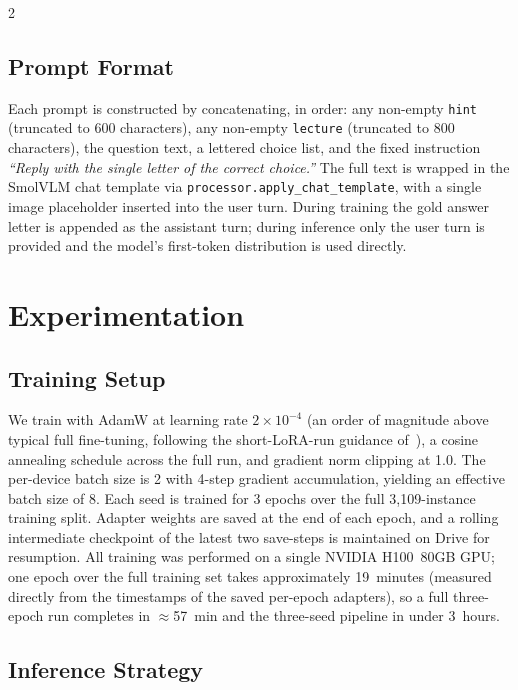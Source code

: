 \documentclass[11pt,a4paper]{article}
\begin{document}
\begin{multicols}{2}
\subsection{Prompt Format}

Each prompt is constructed by concatenating, in order: any non-empty \texttt{hint} (truncated to 600 characters), any non-empty \texttt{lecture} (truncated to 800 characters), the question text, a lettered choice list, and the fixed instruction \emph{``Reply with the single letter of the correct choice.''} The full text is wrapped in the SmolVLM chat template via \texttt{processor.apply\_chat\_template}, with a single image placeholder inserted into the user turn. During training the gold answer letter is appended as the assistant turn; during inference only the user turn is provided and the model's first-token distribution is used directly.

\section{Experimentation}

\subsection{Training Setup}

We train with AdamW at learning rate $2\times10^{-4}$ (an order of magnitude above typical full fine-tuning, following the short-LoRA-run guidance of~\cite{schulman2025loraregret}), a cosine annealing schedule across the full run, and gradient norm clipping at 1.0. The per-device batch size is 2 with 4-step gradient accumulation, yielding an effective batch size of 8. Each seed is trained for 3 epochs over the full 3{,}109-instance training split. Adapter weights are saved at the end of each epoch, and a rolling intermediate checkpoint of the latest two save-steps is maintained on Drive for resumption. All training was performed on a single NVIDIA H100~80GB GPU; one epoch over the full training set takes approximately 19~minutes (measured directly from the timestamps of the saved per-epoch adapters), so a full three-epoch run completes in $\approx$57~min and the three-seed pipeline in under 3~hours.

\subsection{Inference Strategy}


\end{multicols}
\end{document}

